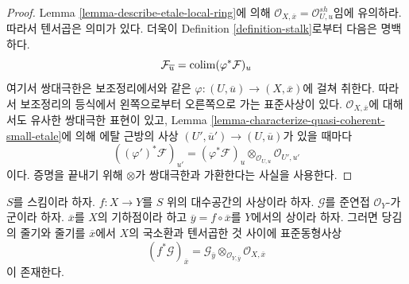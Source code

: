 \begin{proof}
Lemma \ref{lemma-describe-etale-local-ring}에 의해
$\mathcal{O}_{X, \overline{x}} = \mathcal{O}_{U, u}^{sh}$임에 유의하라.
따라서 텐서곱은 의미가 있다. 더욱이 Definition
\ref{definition-stalk}로부터 다음은 명백하다.
$$
\mathcal{F}_{\overline{u}} = \mathop{\mathrm{colim}}\nolimits (\varphi^*\mathcal{F})_u
$$
여기서 쌍대극한은 보조정리에서와 같은
$\varphi : (U, \overline{u}) \to (X, \overline{x})$에 걸쳐 취한다.
따라서 보조정리의 등식에서 왼쪽으로부터 오른쪽으로 가는 표준사상이
있다. $\mathcal{O}_{X, \overline{x}}$에 대해서도 유사한 쌍대극한
표현이 있고, Lemma
\ref{lemma-characterize-quasi-coherent-small-etale}에 의해 에탈 근방의
사상 $(U', \overline{u}') \to (U, \overline{u})$가 있을 때마다
$$
((\varphi')^*\mathcal{F})_{u'} =
(\varphi^*\mathcal{F})_u \otimes_{\mathcal{O}_{U, u}} \mathcal{O}_{U', u'}
$$
이다. 증명을 끝내기 위해 $\otimes$가 쌍대극한과 가환한다는 사실을
사용한다.
\end{proof}

\begin{lemma}
\label{lemma-stalk-pullback-quasi-coherent}
$S$를 스킴이라 하자. $f : X \to Y$를 $S$ 위의 대수공간의 사상이라
하자. $\mathcal{G}$를 준연접 $\mathcal{O}_Y$-가군이라 하자.
$\overline{x}$를 $X$의 기하점이라 하고
$\overline{y} = f \circ \overline{x}$를 $Y$에서의 상이라 하자.
그러면 당김의 줄기와 줄기를 $\overline{x}$에서 $X$의 국소환과
텐서곱한 것 사이에 표준동형사상
$$
(f^*\mathcal{G})_{\overline{x}} =
\mathcal{G}_{\overline{y}} \otimes_{\mathcal{O}_{Y, \overline{y}}}
\mathcal{O}_{X, \overline{x}}
$$
이 존재한다.
\end{lemma}

